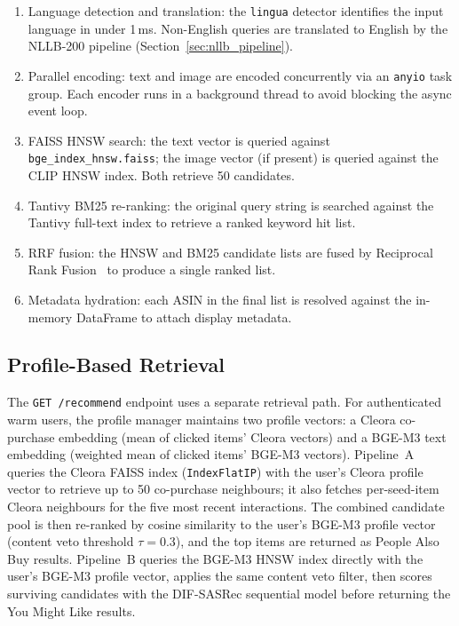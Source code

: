 \begin{enumerate}
    \item Language detection and translation: the \texttt{lingua} detector identifies the input language in under 1\,ms. Non-English queries are translated to English by the NLLB-200 pipeline (Section~\ref{sec:nllb_pipeline}).
    \item Parallel encoding: text and image are encoded concurrently via an \texttt{anyio} task group. Each encoder runs in a background thread to avoid blocking the async event loop.
    \item FAISS HNSW search: the text vector is queried against \nolinkurl{bge_index_hnsw.faiss}; the image vector (if present) is queried against the CLIP HNSW index. Both retrieve 50 candidates.
    \item Tantivy BM25 re-ranking: the original query string is searched against the Tantivy full-text index to retrieve a ranked keyword hit list.
    \item RRF fusion: the HNSW and BM25 candidate lists are fused by Reciprocal Rank Fusion~\cite{cormack2009rrf} to produce a single ranked list.
    \item Metadata hydration: each ASIN in the final list is resolved against the in-memory DataFrame to attach display metadata.
\end{enumerate}

\subsection{Profile-Based Retrieval}

The \texttt{GET /recommend} endpoint uses a separate retrieval path.
For authenticated warm users, the profile manager maintains two profile vectors: a Cleora co-purchase embedding (mean of clicked items' Cleora vectors) and a BGE-M3 text embedding (weighted mean of clicked items' BGE-M3 vectors).
Pipeline~A queries the Cleora FAISS index (\texttt{IndexFlatIP}) with the user's Cleora profile vector to retrieve up to 50 co-purchase neighbours; it also fetches per-seed-item Cleora neighbours for the five most recent interactions.
The combined candidate pool is then re-ranked by cosine similarity to the user's BGE-M3 profile vector (content veto threshold $\tau = 0.3$), and the top items are returned as People Also Buy results.
Pipeline~B queries the BGE-M3 HNSW index directly with the user's BGE-M3 profile vector, applies the same content veto filter, then scores surviving candidates with the DIF-SASRec sequential model before returning the You Might Like results.
